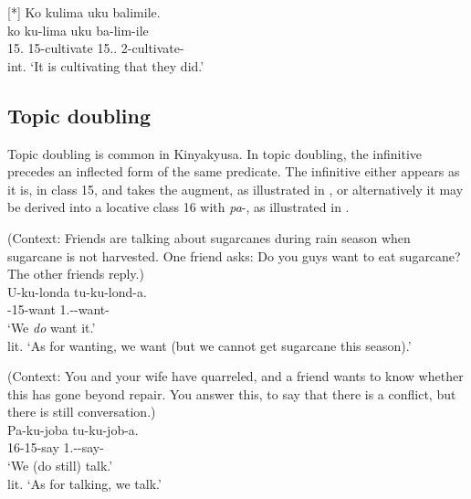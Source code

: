 \documentclass[output=paper]{langscibook}
\begin{document}
\ea
[*]{
\label{bkm:Ref122520263}
Ko kulima uku balimile. \\
\gll
ko  ku-lima  uku  ba-lim-ile  \\
15.\IDCOP{}  15-cultivate  15.\DEM.\PROX{}  2\SM{}-cultivate-\PFV{}\\
\glt
  int. ‘It is cultivating that they did.’\\
}

\z

\subsection{Topic doubling}

Topic doubling is common in Kinyakyusa. In topic doubling, the infinitive precedes an inflected form of the same predicate. The infinitive either appears as it is, in class 15, and takes the augment, as illustrated in , or alternatively it may be derived into a locative class 16 with \textit{pa}-, as illustrated in .

\ea
\label{bkm:Ref123889229}
(Context: Friends are talking about sugarcanes during rain season when sugarcane is not harvested. One friend asks: Do you guys want to eat sugarcane? The other friends reply.)\\

\gll
U-ku-londa{\footnotemark}   tu-ku-lond-a.\\
\AUG{}-15-want  1\PL.\SM{}-\PRS{}-want-\FV{}\\
\glt
‘We \textit{do} want it.’\\
lit. ‘As for wanting, we want (but we cannot get sugarcane this season).’

\z


\ea
\label{bkm:Ref122521250}
(Context: You and your wife have quarreled, and a friend wants to know whether this has gone beyond repair. You answer this, to say that there is a conflict, but there is still conversation.)\\
\gll
Pa-ku-joba  tu-ku-job-a.\\
16-15-say  1\PL.\SM{}-\PRS{}-say-\FV{}\\
\glt
‘We (do still) talk.’\\
lit. ‘As for talking, we talk.’
\end{document}

